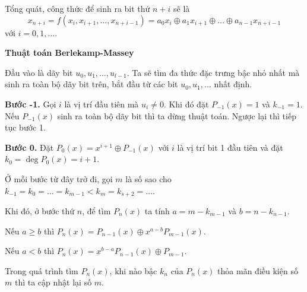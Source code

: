 Tổng quát, công thức để sinh ra bit thứ $n+i$ sẽ là
\begin{equation*}
	x_{n+i} = f(x_i, x_{i+1}, \ldots, x_{n+i-1}) = a_0 x_i \oplus a_1 x_{i+1} \oplus \ldots \oplus a_{n-1} x_{n+i-1} 
\end{equation*}
với $i=0, 1, \ldots$.

\textbf{Thuật toán Berlekamp-Massey}

Đầu vào là dãy bit $u_0, u_1, \ldots, u_{l-1}$. Ta sẽ tìm đa thức đặc trưng bậc nhỏ nhất mà sinh ra toàn bộ dãy bit trên, bắt đầu từ các bit $u_0, u_1, \ldots$ nhất định.

\textbf{Bước -1.} Gọi $i$ là vị trí đầu tiên mà $u_i \neq 0$. Khi đó đặt $P_{-1}(x) = 1$ và $k_{-1} = 1$. Nếu $P_{-1}(x)$ sinh ra toàn bộ dãy bit thì ta dừng thuật toán. Ngược lại thì tiếp tục bước 1.

\textbf{Bước 0.} Đặt $P_0(x) = x^{i+1} \oplus P_{-1}(x)$ với $i$ là vị trí bit 1 đầu tiên và đặt $k_0 = \deg P_0(x) = i+1$.

Ở mỗi bước từ đây trở đi, gọi $m$ là số sao cho $k_{-1} = k_0 = \ldots = k_{m-1} < k_{m} = k_{s+2} = \ldots$.

Khi đó, ở bước thứ $n$, để tìm $P_n(x)$ ta tính $a = m - k_{m-1}$ và $b = n - k_{n-1}$.

Nếu $a \geqslant b$ thì $P_n(x) = P_{n-1}(x) \oplus x^{a-b} P_{m-1}(x)$.

Nếu $a < b$ thì $P_n(x) = x^{b-a} P_{n-1}(x) \oplus P_{m-1}$.

Trong quá trình tìm $P_n(x)$, khi nào bậc $k_n$ của $P_n(x)$ thỏa mãn điều kiện số $m$ thì ta cập nhật lại số $m$.

